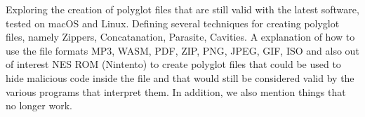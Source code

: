 Exploring the creation of polyglot files that are still valid with the latest software,
tested on macOS and Linux. Defining several techniques for creating polyglot files, namely Zippers, Concatanation, Parasite, Cavities.
A explanation of how to use the file formats MP3, WASM, PDF, ZIP, PNG, JPEG, GIF, ISO and also out of interest NES ROM (Nintento) to create polyglot files that
could be used to hide malicious code inside the file and that would still be considered valid by the various programs that interpret them.
In addition, we also mention things that no longer work.
